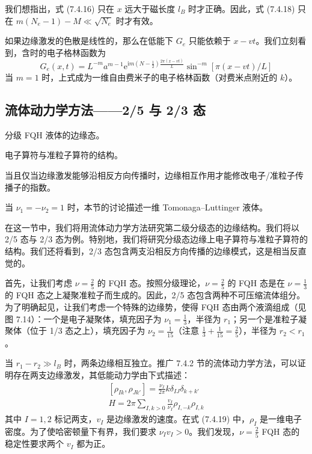 我们想指出，式 (7.4.16) 只在 $x$ 远大于磁长度 $l_B$ 时才正确。因此，式 (7.4.18) 只在 $m(N_e-1)-M\ll\sqrt{N_e}$ 时才有效。

如果边缘激发的色散是线性的，那么在低能下 $G_e$ 只能依赖于 $x-vt$。我们立刻看到，含时的电子格林函数为
\begin{equation*}
G_e(x,t)=L^{-m}a^{m-1}\mathrm{e}^{\mathrm{i}m\left(N-\frac{1}{2}\right)\frac{2\pi(x-vt)}{L}}\sin^{-m}[\pi(x-vt)/L]
\end{equation*}
当 $m=1$ 时，上式成为一维自由费米子的电子格林函数（对费米点附近的 $k$）。

\subsection{流体动力学方法——2/5 与 2/3 态}

\begin{keypoints}
\item 分级 FQH 液体的边缘态。
\item 电子算符与准粒子算符的结构。
\item 当且仅当边缘激发能够沿相反方向传播时，边缘相互作用才能修改电子/准粒子传播子的指数。
\item 当 $\nu_1=-\nu_2=1$ 时，本节的讨论描述一维 Tomonaga--Luttinger 液体。
\end{keypoints}

在这一节中，我们将用流体动力学方法研究第二级分级态的边缘结构。我们将以 2/5 态与 2/3 态为例。特别地，我们将研究分级态边缘上电子算符与准粒子算符的结构。我们还将看到，2/3 态包含两支沿相反方向传播的边缘模式，这是相当反直觉的。

首先，让我们考虑 $\nu=\frac{2}{5}$ 的 FQH 态。按照分级理论，$\nu=\frac{2}{5}$ 的 FQH 态是在 $\nu=\frac{1}{3}$ 的 FQH 态之上凝聚准粒子而生成的。因此，2/5 态包含两种不可压缩流体组分。为了明确起见，让我们考虑一个特殊的边缘势，使得 FQH 态由两个液滴组成（见图 7.14）：一个是电子凝聚体，填充因子为 $\nu_1=\frac{1}{3}$，半径为 $r_1$；另一个是准粒子凝聚体（位于 1/3 态之上），填充因子为 $\nu_2=\frac{1}{15}$（注意 $\frac{1}{3}+\frac{1}{15}=\frac{2}{5}$），半径为 $r_2<r_1$。

当 $r_1-r_2\gg l_B$ 时，两条边缘相互独立。推广 7.4.2 节的流体动力学方法，可以证明存在两支边缘激发，其低能动力学由下式描述：
\begin{equation*}
\begin{gathered}
[\rho_{Ik},\rho_{Jk'}]=\frac{\nu_I}{2\pi}k\delta_{IJ}\delta_{k+k'}\\
H=2\pi\sum_{I,k>0}\frac{v_I}{\nu_I}\rho_{I,-k}\rho_{I,k}
\end{gathered}
\tag{7.4.19}
\end{equation*}
其中 $I=1,2$ 标记两支，$v_I$ 是边缘激发的速度。在式 (7.4.19) 中，$\rho_I$ 是一维电子密度。为了使哈密顿量下有界，我们要求 $\nu_Iv_I>0$。我们发现，$\nu=\frac{2}{5}$ FQH 态的稳定性要求两个 $v_I$ 都为正。

